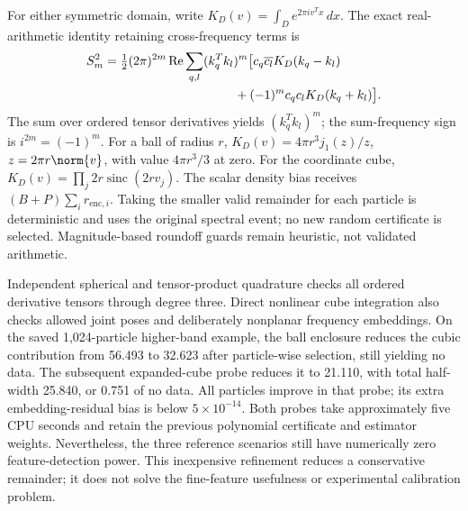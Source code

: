 For either symmetric domain, write \(K_D(v)=\int_D e^{2\pi i v^Tx}\,dx\).
The exact real-arithmetic identity retaining cross-frequency terms is
\begin{align}
 S_m^2={}&\tfrac12(2\pi)^{2m}\operatorname{Re}
 \sum_{q,l}(k_q^Tk_l)^m\bigl[
 c_q\overline{c_l}K_D(k_q-k_l)\nonumber\\
 &\hspace{32mm}+(-1)^m c_qc_l K_D(k_q+k_l)\bigr].
\end{align}
The sum over ordered tensor derivatives yields \((k_q^Tk_l)^m\);
the sum-frequency sign is \(i^{2m}=(-1)^m\). For a ball of radius \(r\),
\(K_D(v)=4\pi r^3j_1(z)/z\), \(z=2\pi r\norm{v}\), with value
\(4\pi r^3/3\) at zero. For the coordinate cube,
\(K_D(v)=\prod_j 2r\operatorname{sinc}(2rv_j)\).
The scalar density bias receives \((B+P)\sum_i r_{\mathrm{enc},i}\).
Taking the smaller valid remainder for each particle is deterministic and
uses the original spectral event; no new random certificate is selected.
Magnitude-based roundoff guards remain heuristic, not validated arithmetic.

Independent spherical and tensor-product quadrature checks all ordered
derivative tensors through degree three. Direct nonlinear cube integration
also checks allowed joint poses and deliberately nonplanar frequency
embeddings. On the saved 1,024-particle higher-band example, the ball enclosure
reduces the cubic contribution from 56.493 to 32.623 after particle-wise
selection, still yielding no data. The subsequent expanded-cube probe reduces
it to 21.110, with total half-width 25.840, or 0.751 of no data. All particles
improve in that probe; its extra embedding-residual bias is below
\(5\times10^{-14}\). Both probes take approximately five CPU seconds and
retain the previous polynomial certificate and estimator weights. Nevertheless,
the three reference scenarios still have numerically zero feature-detection
power. This inexpensive refinement reduces a conservative remainder; it does
not solve the fine-feature usefulness or experimental calibration problem.
